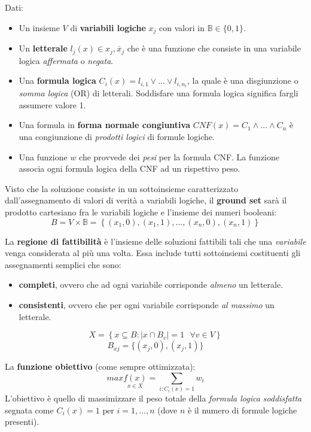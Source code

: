 \documentclass{article}
\begin{document}
Dati:
\begin{itemize}
    \item Un insieme $V$ di \textbf{variabili logiche} $x_j$ con valori in $\mathbb{B}\in \{0,1\}$.
    \item Un \textbf{letterale} $l_j(x)\in {x_j,\overline{x}_j}$ che è una funzione che consiste in una variabile logica
          \textit{affermata} o \textit{negata}.
    \item Una \textbf{formula logica} $C_i(x)=l_{i,1} \lor ... \lor l_{i,n_i}$, la quale è
          una disgiunzione o \textit{somma logica} (OR) di letterali. Soddisfare una formula
          logica significa fargli assumere valore 1.
    \item Una formula in \textbf{forma normale congiuntiva} $CNF(x)=C_1\land ... \land C_n$ è una congiunzione di \textit{prodotti logici} di formule logiche.
    \item Una funzione $w$ che provvede dei \textit{pesi} per la formula CNF. La funzione associa ogni formula logica
          della CNF ad un rispettivo peso.
\end{itemize}

Visto che la soluzione consiste in un sottoinsieme caratterizzato dall'assegnamento
di valori di verità a variabili logiche, il \textbf{ground set} sarà il prodotto cartesiano
fra le variabili logiche e l'insieme dei numeri booleani:
$$B=V\times\mathbb{B}=\left\{(x_1,0),(x_1,1),...,(x_n,0),(x_n,1)\right\}$$

La \textbf{regione di fattibilità} è l'insieme delle soluzioni fattibili tali che una \textit{variabile}
venga considerata al più una volta. Essa include tutti sottoinsiemi costituenti
gli assegnamenti semplici che sono:
\begin{itemize}
    \item \textbf{completi}, ovvero che ad ogni variabile corrisponde \textit{almeno} un letterale.
    \item \textbf{consistenti}, ovvero che per ogni variabile corrisponde \textit{al massimo} un letterale.
\end{itemize}

$$X=\left\{x\subseteq B : |x\cap B_v|=1 \text{ }\forall v \in V \right\}$$
$$B_{xj}=\{(x_j,0),(x_j,1)\}$$

La \textbf{funzione obiettivo} (come sempre ottimizzata):
$$max\underset{x\in X}{f(x)}=\sum_{i:C_i(x)=1}w_i$$
L'obiettivo è quello di massimizzare il peso totale della \textit{formula logica soddisfatta}
segnata come $C_i(x)=1 \text{ per } i=1,...,n$ (dove $n$ è il numero di formule logiche presenti).
\end{document}

